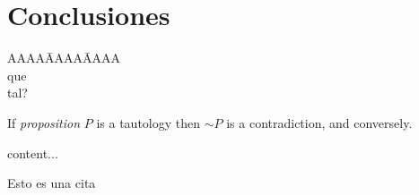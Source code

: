 \chapter{Conclusiones}
\label{cha:conclusiones}
\begin{tabbing}
AAAA\=AAAA\=AAAA\kill\\
\>que\\
\>\>tal?\\
\end{tabbing}
\begin{theorem}
If \emph{proposition} $P$ is a tautology then $\sim P$ is a contradiction, and conversely.
\end{theorem}
\begin{theorem}
content...
\end{theorem}

Esto es una cita \cite{bolourchi2013}


